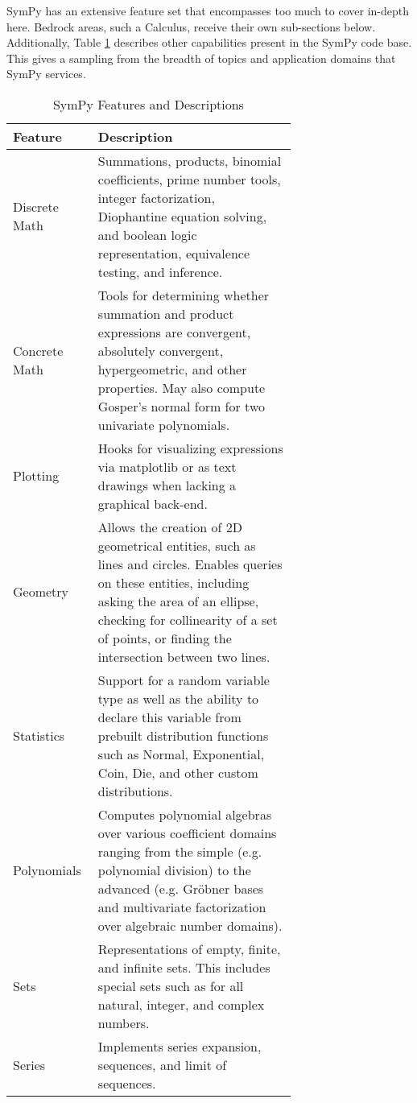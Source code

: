 
SymPy has an extensive feature set that encompasses too much to cover
in-depth here. Bedrock areas, such a Calculus, receive their own sub-sections
below. Additionally, Table \ref{features-table} describes other capabilities
present in the SymPy code base. This gives a sampling from the breadth of
topics and application domains that SymPy services.

\begin{table}
\label{features-table}
\caption{SymPy Features and Descriptions}
\begin{tabular}[htbc]{|l|p{0.7\linewidth}|}
\hline
\textbf{Feature} & \textbf{Description} \\
\hline
Discrete Math & Summations, products, binomial coefficients,
    prime number tools, integer factorization, Diophantine equation solving, and
    boolean logic representation, equivalence testing, and inference.\\
Concrete Math & Tools for determining whether summation and product
    expressions are convergent, absolutely convergent, hypergeometric, and
    other properties. May also compute Gosper's normal form
    \cite{petkovvsek1996bak} for two univariate polynomials.\\
Plotting & Hooks for visualizing expressions via matplotlib \cite{Hunter:2007}
    or as text drawings when lacking a graphical back-end.\\
Geometry & Allows the creation of 2D geometrical entities,
    such as lines and circles. Enables queries on these entities, including
    asking the area of an ellipse, checking for collinearity of a set of
    points, or finding the intersection between two lines.\\
Statistics & Support for a random variable type as well as the ability to
    declare this variable from prebuilt distribution functions such as
    Normal, Exponential, Coin, Die, and other custom distributions.\\
Polynomials & Computes polynomial algebras over various coefficient domains
    ranging from the simple (e.g. polynomial division) to the advanced
    (e.g. Gr\"obner bases \cite{adams1994introduction} and multivariate
    factorization over algebraic number domains).\\
Sets & Representations of empty, finite, and infinite sets. This includes
    special sets such as for all natural, integer, and complex numbers.\\
Series & Implements series expansion, sequences, and limit of sequences.

\end{tabular}
\end{table}

